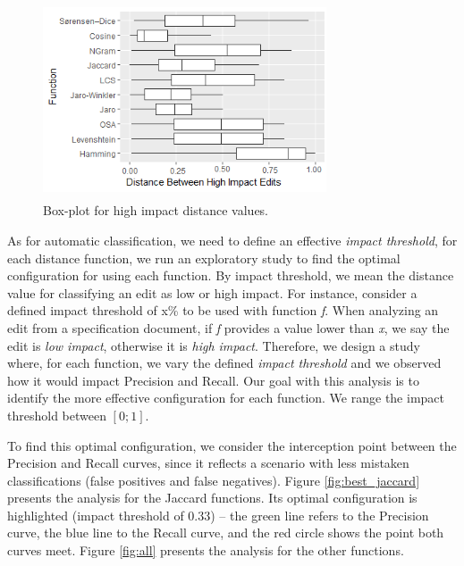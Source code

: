 \begin{figure}[h]
\centering
\includegraphics[height=2.3in,width=3.3in]{figs/Boxplot_SAFF_BZT_HIGH2.png}
\caption{Box-plot for high impact distance values.}
\label{fig:bp_dist_h}
\end{figure}

As for automatic classification, we need to define an effective \textit{impact threshold}, for each distance function, we run an exploratory study to find the optimal configuration for using each function. By impact threshold, we mean the distance value for classifying an edit as low or high impact. For instance, consider a defined impact threshold of x\% to be used with function \textit{f}. When analyzing an edit from a specification document, if \textit{f} provides a value lower than \textit{x}, we say the edit is \textit{low impact}, otherwise it is \textit{high impact}. Therefore, we design a study where, for each function, we vary the defined \textit{impact threshold} and we observed how it would impact Precision and Recall. Our goal with this analysis is to identify the more effective configuration for each function. We range the impact threshold between $[0;1]$. 

To find this optimal configuration, we consider the interception point between the Precision and Recall curves, since it reflects a scenario with less mistaken classifications (false positives and false negatives). %
Figure \ref{fig:best_jaccard} presents the analysis for the Jaccard functions. Its optimal configuration is highlighted (impact threshold of 0.33) --  the green line refers to the Precision curve, the blue line to the Recall curve, and the red circle shows the point both curves meet. Figure \ref{fig:all} presents the analysis for the other functions. 



